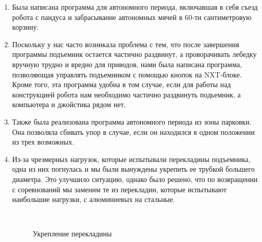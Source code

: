 \begin{enumerate}
	\item Была написана программа для автономного периода, включавшая в себя съезд робота с пандуса и забрасывание автономных мячей в 60-ти сантиметровую корзину.
	
	\item Поскольку у нас часто возникала проблема с тем, что после завершения программы подъемник остается частично раздвинут, а проворачивать лебедку вручную трудно и вредно для приводов, нами была написана программа, позволяющая управлять подъемником с помощью кнопок на NXT-блоке. Кроме того, эта программа удобна в том случае, если для работы над конструкцией робота нам необходимо частично раздвинуть подьемник, а компьютера и джойстика рядом нет.
	
	\item Также была реализована программа автономного периода из зоны парковки. Она позволяла сбивать упор в случае, если он находился в одном положении из трех возможных.
	
	\item Из-за чрезмерных нагрузок, которые испытывали перекладины подъемника, одна из них погнулась и мы были вынуждены укрепить ее трубкой большего диаметра. Это улучшило ситуацию, однако было решено, что по возвращении с соревнований мы заменим те из перекладин, которые испытывают наибольшие нагрузки, с алюминиевых на стальные.
	
	\begin{figure}[H]
		\begin{minipage}[h]{0.2\linewidth}
			\center  
		\end{minipage}
		\begin{minipage}[h]{0.6\linewidth}
			\caption{Укрепление перекладины}
		\end{minipage}
	\end{figure}
	

\end{enumerate}
